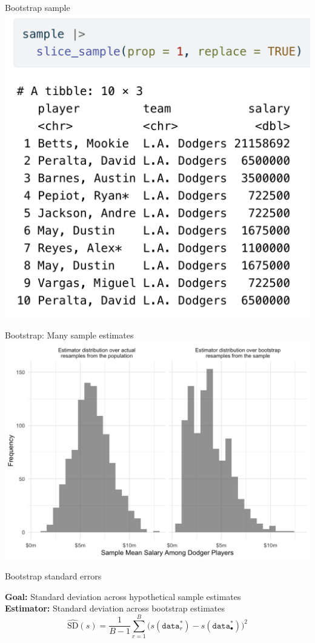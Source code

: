 \documentclass{beamer}
\begin{document}
\begin{frame}{Bootstrap sample}
\includegraphics[width = .7\textwidth]{figures/bootstrap_sample}
\end{frame}

\begin{frame}{Bootstrap: Many sample estimates}
\includegraphics[width = \textwidth]{figures/bs_dist}
\end{frame}

\begin{frame}{Bootstrap standard errors} \pause

\textbf{Goal:} Standard deviation across hypothetical sample estimates \pause \\
\textbf{Estimator:} Standard deviation across bootstrap estimates
$$
\widehat{\text{SD}}(s) = \frac{1}{B-1}\sum_{r=1}^B \bigg(s(\texttt{data}^*_r) - s(\texttt{data}^*_\bullet)\bigg)^2
$$

\end{frame}
\end{document}
